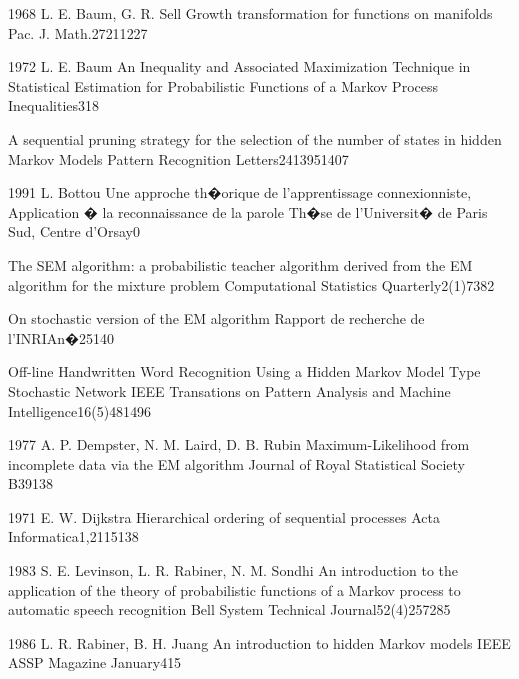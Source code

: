 
 {1968} { L. E. Baum, G. R. Sell}
{Growth transformation for functions on manifolds}
{Pac. J. Math.}{27}{211}{227}

 {1972} {L. E. Baum}
{An Inequality and Associated Maximization Technique in Statistical Estimation for Probabilistic Functions of a Markov Process}
{Inequalities}{3}{1}{8}

{A sequential pruning strategy for the selection of the number of states in hidden Markov Models}
{Pattern Recognition Letters}{24}{1395}{1407}

 {1991} {L. Bottou}
{Une approche th�orique de l'apprentissage connexionniste, Application � la reconnaissance de la parole}
{Th�se de l'Universit� de Paris Sud, Centre d'Orsay}{}{0}{}

{The SEM algorithm: a probabilistic teacher algorithm derived from the EM algorithm for the mixture problem}
{Computational Statistics Quarterly}{2(1)}{73}{82}

{On stochastic version of the EM algorithm}
{Rapport de recherche de l'INRIA}{n�2514}{0}{}

{Off-line Handwritten Word Recognition Using a Hidden Markov Model Type Stochastic Network}
{IEEE Transations on Pattern Analysis and Machine Intelligence}{16(5)}{481}{496}

 {1977} {A. P. Dempster, N. M. Laird, D. B. Rubin}
{Maximum-Likelihood from incomplete data via the EM algorithm}
{Journal of Royal Statistical Society B}{39}{1}{38}

 {1971} {E. W. Dijkstra}
{Hierarchical ordering of sequential processes}
{Acta Informatica}{1,2}{115}{138}

 {1983} {S. E. Levinson, L. R. Rabiner, N. M. Sondhi}
{An introduction to the application of the theory of probabilistic functions of a Markov process to automatic speech recognition}
{Bell System Technical Journal}{52(4)}{257}{285}

 {1986} {L. R. Rabiner, B. H. Juang}
{An introduction to hidden Markov models}
{IEEE ASSP Magazine January}{}{4}{15}

